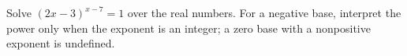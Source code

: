 Solve $(2x-3)^{x-7}=1$ over the real numbers. For a negative base, interpret the power only when the exponent is an integer; a zero base with a nonpositive exponent is undefined.
